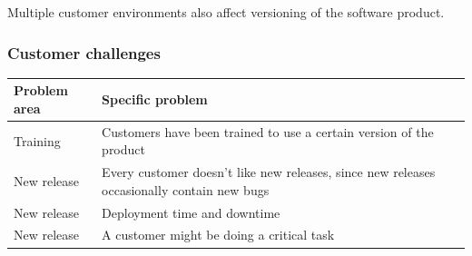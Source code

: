 \documentclass[english]{tktltiki2}
\theoremstyle{definition}
\theoremstyle{remark}
\begin{document}


Multiple customer environments also affect versioning of the software product. 


\subsubsection{Customer challenges}

\begin{center}
    \begin{tabular}{ | l | p{5cm} |}
    \hline
    Problem area & Specific problem \\ \hline
    Training & Customers have been trained to use a certain version of the product \\ \hline
	New release & Every customer doesn't like new releases, since new releases occasionally contain new bugs \\ \hline
	New release & Deployment time and downtime \\ \hline
	New release & A customer might be doing a critical task \\
    \hline
    \end{tabular}
\end{center}
\end{document}
